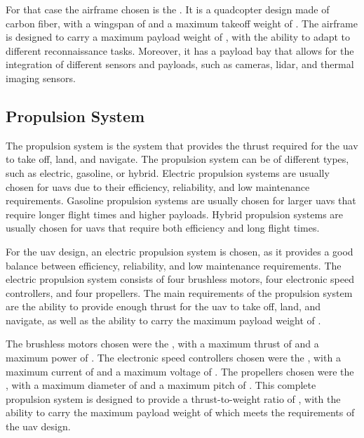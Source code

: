 For that case the airframe chosen  is the . It is a quadcopter design made of carbon fiber, with a wingspan of  and a maximum takeoff weight of . The airframe is designed to carry a maximum payload weight of , with the ability to adapt to different reconnaissance tasks. Moreover, it has a payload bay that allows for the integration of different sensors and payloads, such as cameras, lidar, and thermal imaging sensors.


\subsection{Propulsion System}\label{subsec:design_propulsion_system}

The propulsion system is the system that provides the thrust required for the \gls{uav} to take off, land, and navigate. The propulsion system can be of different types, such as electric, gasoline, or hybrid. Electric propulsion systems are usually chosen for \glspl{uav} due to their efficiency, reliability, and low maintenance requirements. Gasoline propulsion systems are usually chosen for larger \glspl{uav} that require longer flight times and higher payloads. Hybrid propulsion systems are usually chosen for \glspl{uav} that require both efficiency and long flight times.

For the \gls{uav} design, an electric propulsion system is chosen, as it provides a good balance between efficiency, reliability, and low maintenance requirements. The electric propulsion system consists of four brushless motors, four electronic speed controllers, and four propellers. The main requirements of the propulsion system are the ability to provide enough thrust for the \gls{uav} to take off, land, and navigate, as well as the ability to carry the maximum payload weight of .

The brushless motors chosen were the , with a maximum thrust of  and a maximum power of . The electronic speed controllers chosen were the , with a maximum current of  and a maximum voltage of . The propellers chosen were the , with a maximum diameter of  and a maximum pitch of . This complete propulsion system is designed to provide a thrust-to-weight ratio of , with the ability to carry the maximum payload weight of  which meets the requirements of the \gls{uav} design.


